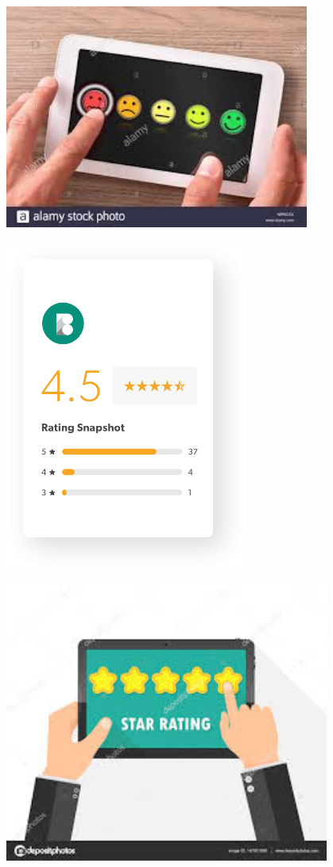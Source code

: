 \documentclass[]{article}
\begin{document}
\begin{center}
\includegraphics[width=0.75\textwidth]{images/image31.png}
\end{center}

\begin{center}
\includegraphics[width=0.6\textwidth]{images/image30.png}
\end{center}




\begin{center}
\includegraphics[width=0.8\textwidth]{images/image32.png}
\end{center}
\end{document}
